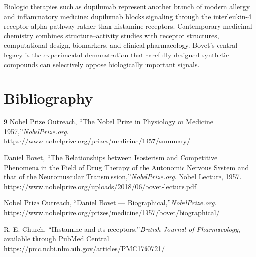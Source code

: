 Biologic therapies such as dupilumab represent another branch of modern allergy and inflammatory medicine: dupilumab blocks signaling through the interleukin-4 receptor alpha pathway rather than histamine receptors. Contemporary medicinal chemistry combines structure--activity studies with receptor structures, computational design, biomarkers, and clinical pharmacology. Bovet's central legacy is the experimental demonstration that carefully designed synthetic compounds can selectively oppose biologically important signals.

\section{Bibliography}

\begin{thebibliography}{9}
Nobel Prize Outreach, ``The Nobel Prize in Physiology or Medicine 1957,''\emph{NobelPrize.org}.\\
\url{https://www.nobelprize.org/prizes/medicine/1957/summary/}

Daniel Bovet, ``The Relationships between Isosterism and Competitive Phenomena in the Field of Drug Therapy of the Autonomic Nervous System and that of the Neuromuscular Transmission,''\emph{NobelPrize.org}. Nobel Lecture, 1957.\\
\url{https://www.nobelprize.org/uploads/2018/06/bovet-lecture.pdf}

Nobel Prize Outreach, ``Daniel Bovet --- Biographical,''\emph{NobelPrize.org}.\\
\url{https://www.nobelprize.org/prizes/medicine/1957/bovet/biographical/}

R. E. Church, ``Histamine and its receptors,''\emph{British Journal of Pharmacology}, available through PubMed Central.\\
\url{https://pmc.ncbi.nlm.nih.gov/articles/PMC1760721/}
\end{thebibliography}
